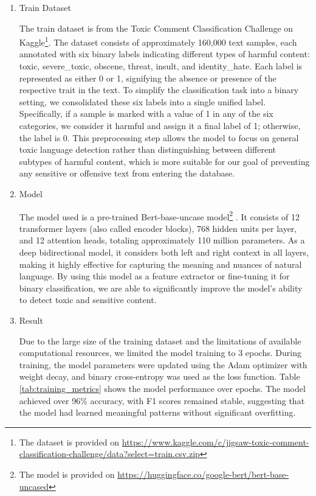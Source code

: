 \documentclass{article}
\begin{document}
\begin{enumerate}
    \item Train Dataset
    
    The train dataset is from the Toxic Comment Classification Challenge on Kaggle\footnote{The dataset is provided on \url{https://www.kaggle.com/c/jigsaw-toxic-comment-classification-challenge/data?select=train.csv.zip}}. The dataset consists of approximately 160,000 text samples, each annotated with six binary labels indicating different types of harmful content: toxic, severe\_toxic, obscene, threat, insult, and identity\_hate. Each label is represented as either 0 or 1, signifying the absence or presence of the respective trait in the text. To simplify the classification task into a binary setting, we consolidated these six labels into a single unified label. Specifically, if a sample is marked with a value of 1 in any of the six categories, we consider it harmful and assign it a final label of 1; otherwise, the label is 0. This preprocessing step allows the model to focus on general toxic language detection rather than distinguishing between different subtypes of harmful content, which is more suitable for our goal of preventing any sensitive or offensive text from entering the database. 
    \item Model
    
    The model used is a pre-trained Bert-base-uncase model\footnote{The model is provided on \url{https://huggingface.co/google-bert/bert-base-uncased}} \cite{devlin2018bert}. It consists of 12 transformer layers (also called encoder blocks), 768 hidden units per layer, and 12 attention heads, totaling approximately 110 million parameters. As a deep bidirectional model, it considers both left and right context in all layers, making it highly effective for capturing the meaning and nuances of natural language. By using this model as a feature extractor or fine-tuning it for binary classification, we are able to significantly improve the model’s ability to detect toxic and sensitive content.

    \item Result
    
    Due to the large size of the training dataset and the limitations of available computational resources, we limited the model training to 3 epochs. During training, the model parameters were updated using the Adam optimizer with weight decay, and binary cross-entropy was used as the loss function.  Table \ref{tab:training_metrics} shows the model performance over epochs. The model achieved over 96\% accuracy, with F1 scores remained stable, suggesting that the model had learned meaningful patterns without significant overfitting. 
    

\end{enumerate}
\end{document}
